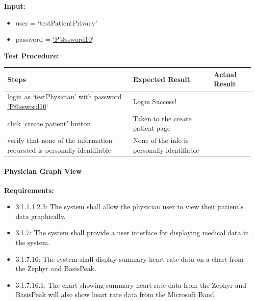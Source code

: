 \documentclass[letterpaper,10pt,english]{sphinxmanual}
\begin{document}
\textbf{Input:}
\begin{itemize}
\item {} 
user = `testPatientPrivacy'

\item {} 
password = \href{mailto:'P@ssword10}{`P@ssword10}`

\end{itemize}

\textbf{Test Procedure:}

\begin{tabulary}{\linewidth}{|L|L|L|}
\hline
\textsf{\relax 
Steps
} & \textsf{\relax 
Expected Result
} & \textsf{\relax 
Actual Result
}\\
\hline
login as `testPhysician' with password \href{mailto:'P@ssword10}{`P@ssword10}`
 & 
Login Success!
 & \\
\hline
click `create patient' button
 & 
Taken to the create patient page
 & \\
\hline
verify that none of the information requested is personally identifiable
 & 
None of the info is personally identifiable
 & \\
\hline\end{tabulary}



\paragraph{Physician Graph View}
\label{STD/manual_test_descriptions:physician-graph-view}
\textbf{Requirements:}
\begin{itemize}
\item {} 
3.1.1.1.2.3: The system shall allow the physician user to view their patient’s data graphically.

\item {} 
3.1.7: The system shall provide a user interface for displaying medical data in the system.

\item {} 
3.1.7.16: The system shall display summary heart rate data on a chart from the Zephyr and BasisPeak.

\item {} 
3.1.7.16.1: The chart showing summary heart rate data from the Zephyr and BasisPeak will also show heart rate data from the Microsoft Band.

\end{itemize}
\end{document}
